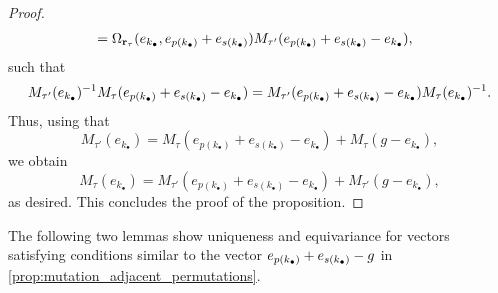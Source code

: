 \begin{proof}
\begin{align*}
		 & = \Omega_{\mathbf{r}_{\tau}}(e_{k_\bullet}, e_{p(k_\bullet)} + e_{s(k_\bullet)}) M_{\tau'}(e_{p(k_\bullet)} + e_{s(k_\bullet)} - e_{k_\bullet}),
	\end{align*}
	such that
	\begin{equation*}
		M_{\tau'}(e_{k_\bullet})^{-1} M_\tau(e_{p(k_\bullet)} + e_{s(k_\bullet)} - e_{k_\bullet}) = M_{\tau'}(e_{p(k_\bullet)} + e_{s(k_\bullet)} - e_{k_\bullet})M_\tau(e_{k_\bullet})^{-1}.
	\end{equation*}
	Thus, using that
	\begin{equation*}
		M_{\tau'}(e_{k_\bullet}) = M_{\tau}(e_{p(k_\bullet)}+e_{s(k_\bullet)}-e_{k_\bullet}) + M_{\tau}(g-e_{k_\bullet}),
	\end{equation*}
	we obtain
	\begin{equation*}
		M_{\tau}(e_{k_\bullet}) = M_{\tau'}(e_{p(k_\bullet)}+e_{s(k_\bullet)}-e_{k_\bullet}) + M_{\tau'}(g-e_{k_\bullet}),
	\end{equation*}
	as desired. This concludes the proof of the proposition.
\end{proof}

The following two lemmas show uniqueness and equivariance for vectors satisfying
conditions similar to the vector $e_{p(k_\bullet)} + e_{s(k_\bullet)} - g$ in
\cref{prop:mutation_adjacent_permutations}.

